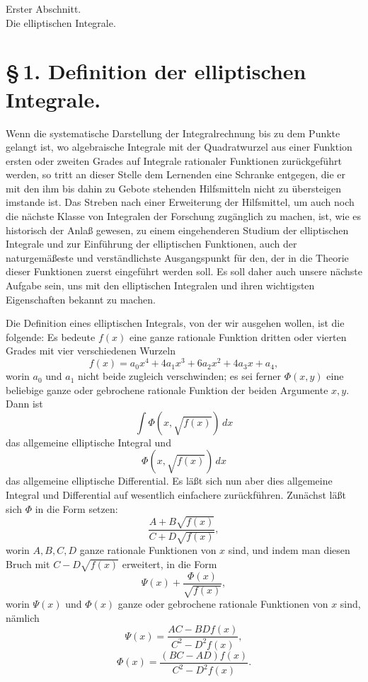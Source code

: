 \documentclass[11pt]{article}
\begin{document}
\begin{center}
{\large Erster Abschnitt.}\\[0.7em]
{\Large Die elliptischen Integrale.}
\end{center}

\section*{\S\,1. Definition der elliptischen Integrale.}

Wenn die systematische Darstellung der Integralrechnung bis zu dem Punkte gelangt ist, wo algebraische Integrale mit der Quadratwurzel aus einer Funktion ersten oder zweiten Grades auf Integrale rationaler Funktionen zurückgeführt werden, so tritt an dieser Stelle dem Lernenden eine Schranke entgegen, die er mit den ihm bis dahin zu Gebote stehenden Hilfsmitteln nicht zu übersteigen imstande ist. Das Streben nach einer Erweiterung der Hilfsmittel, um auch noch die nächste Klasse von Integralen der Forschung zugänglich zu machen, ist, wie es historisch der Anlaß gewesen, zu einem eingehenderen Studium der elliptischen Integrale und zur Einführung der elliptischen Funktionen, auch der naturgemäßeste und verständlichste Ausgangspunkt für den, der in die Theorie dieser Funktionen zuerst eingeführt werden soll. Es soll daher auch unsere nächste Aufgabe sein, uns mit den elliptischen Integralen und ihren wichtigsten Eigenschaften bekannt zu machen.

Die Definition eines elliptischen Integrals, von der wir ausgehen wollen, ist die folgende: Es bedeute $f(x)$ eine ganze rationale Funktion dritten oder vierten Grades mit vier verschiedenen Wurzeln
\begin{equation}
f(x)=a_0x^4+4a_1x^3+6a_2x^2+4a_3x+a_4,
\tag{1}
\end{equation}
worin $a_0$ und $a_1$ nicht beide zugleich verschwinden; es sei ferner $\Phi(x,y)$ eine beliebige ganze oder gebrochene rationale Funktion der beiden Argumente $x,y$. Dann ist
\[
\int \Phi(x,\sqrt{f(x)})\,dx
\]
das allgemeine elliptische Integral und
\[
\Phi(x,\sqrt{f(x)})\,dx
\]
das allgemeine elliptische Differential. Es läßt sich nun aber dies allgemeine Integral und Differential auf wesentlich einfachere zurückführen. Zunächst läßt sich $\Phi$ in die Form setzen:
\[
\frac{A+B\sqrt{f(x)}}{C+D\sqrt{f(x)}},
\]
worin $A,B,C,D$ ganze rationale Funktionen von $x$ sind, und indem man diesen Bruch mit $C-D\sqrt{f(x)}$ erweitert, in die Form
\[
\Psi(x)+\frac{\Phi(x)}{\sqrt{f(x)}},
\]
worin $\Psi(x)$ und $\Phi(x)$ ganze oder gebrochene rationale Funktionen von $x$ sind, nämlich
\[
\Psi(x)=\frac{AC-BD f(x)}{C^2-D^2 f(x)},
\]
\[
\Phi(x)=\frac{(BC-AD)f(x)}{C^2-D^2 f(x)}.
\]
\end{document}
